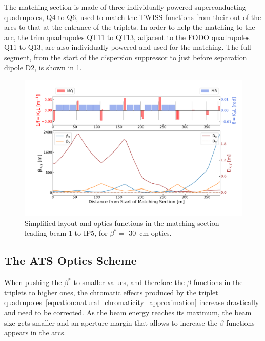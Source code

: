 The matching section is made of three individually powered superconducting quadrupoles, Q\num{4} to Q\num{6}, used to match the TWISS functions from their out of the arcs to that at the entrance of the triplets.
In order to help the matching to the arc, the trim quadrupoles QT\num{11} to QT\num{13}, adjacent to the FODO quadrupoles Q\num{11} to Q\num{13}, are also individually powered and used for the matching.
The full segment, from the start of the dispersion suppressor to just before separation dipole D\num{2}, is shown in \cref{figure:lhc_matching_section}.

\begin{figure}[!hbt]
  \centering
  \includegraphics*[width=0.99\linewidth]{Figures/Optics_Measurements_Corrections_at_LHC/lhc_matching_section.pdf}
  \caption{Simplified layout and optics functions in the matching section leading beam \num{1} to IP\num{5}, for \(\beta^{\ast} =\) \qty{30}{\centi\meter} optics.}
  \label{figure:lhc_matching_section}
\end{figure}

\subsection{The ATS Optics Scheme}

When pushing the \(\beta^{\ast}\) to smaller values, and therefore the \(\beta\)-functions in the triplets to higher ones, the chromatic effects produced by the triplet quadrupoles~\cref{equation:natural_chromaticity_approximation} increase drastically and need to be corrected.
As the beam energy reaches its maximum, the beam size gets smaller and an aperture margin that allows to increase the \(\beta\)-functions appears in the arcs.

